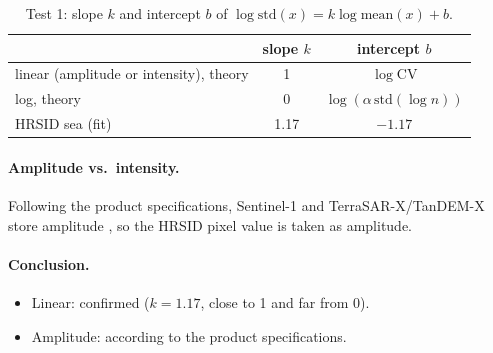 \documentclass[11pt,a4paper]{article}
\begin{document}
\begin{table}[H]
\centering
\caption{Test 1: slope $k$ and intercept $b$ of $\log\mathrm{std}(x) = k\log\mathrm{mean}(x) + b$.}
\begin{tabular}{|l|c|c|}
\hline
 & slope $k$ & intercept $b$ \\
\hline
linear (amplitude or intensity), theory & 1 & $\log\mathrm{CV}$ \\
\hline
log, theory & 0 & $\log(\alpha\,\mathrm{std}(\log n))$ \\
\hline
HRSID sea (fit) & 1.17 & $-1.17$ \\
\hline
\end{tabular}
\end{table}

\paragraph{Amplitude vs.\ intensity.} Following the product specifications, Sentinel-1 and TerraSAR-X/TanDEM-X store
amplitude \cite{s1cal,tsxcal}, so the HRSID pixel value is taken as amplitude.

\paragraph{Conclusion.}
\begin{itemize}
  \item Linear: confirmed ($k = 1.17$, close to 1 and far from 0).
  \item Amplitude: according to the product specifications.
\end{itemize}

\end{document}
